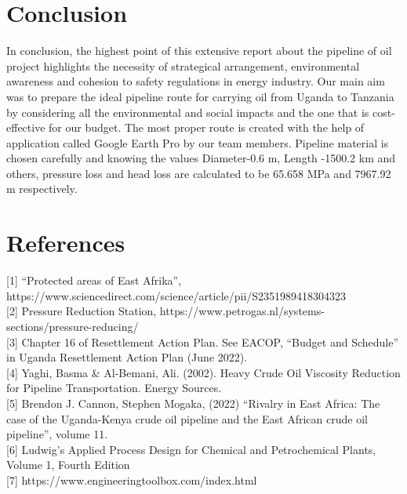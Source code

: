 \documentclass[12pt]{article}
\begin{document}
\section{Conclusion}
{\fontsize{12pt}{12pt}\selectfont
\hspace*{1em} In conclusion, the highest point of this extensive report about the pipeline of oil project highlights the necessity of strategical arrangement, environmental awareness and cohesion to safety regulations in energy industry. Our main aim was to prepare the ideal pipeline route for carrying oil from Uganda to Tanzania by considering all the environmental and social impacts and the one that is cost-effective for our budget. The most proper route is created with the help of application called Google Earth Pro by our team members. Pipeline material is chosen carefully and knowing the values Diameter-0.6 m, Length -1500.2 km and others, pressure loss and head loss are calculated to be 65.658 MPa and 7967.92 m respectively.

}

\section{References}

{\fontsize{12pt}{12pt}\selectfont

[1]	“Protected areas of East Afrika”, https://www.sciencedirect.com/science/article/pii/S2351989418304323 \\

[2]	Pressure Reduction Station, https://www.petrogas.nl/systems-sections/pressure-reducing/ \\

[3]	Chapter 16 of Resettlement Action Plan. See EACOP, “Budget and Schedule” in Uganda Resettlement Action Plan (June 2022). \\

[4]	Yaghi, Basma \& Al-Bemani, Ali. (2002). Heavy Crude Oil Viscosity Reduction for Pipeline Transportation. Energy Sources. \\

[5]	Brendon J. Cannon, Stephen Mogaka, (2022) “Rivalry in East Africa: The case of the Uganda-Kenya crude oil pipeline and the East African crude oil pipeline”, volume 11. \\

[6]	Ludwig's Applied Process Design for Chemical and Petrochemical Plants, Volume 1, Fourth Edition \\

[7]	https://www.engineeringtoolbox.com/index.html \\

}
\end{document}
